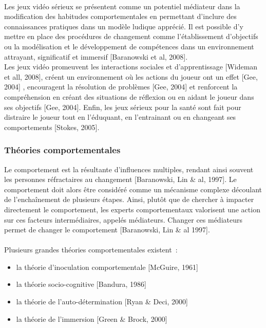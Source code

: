 \paragraph{}
Les jeux vidéo sérieux se présentent comme un potentiel médiateur dans la modification des habitudes comportementales en permettant d’inclure des connaissances pratiques dans un modèle ludique apprécié. Il est possible d’y mettre en place des procédures de changement comme l’établissement d’objectifs ou la modélisation et le développement de compétences dans un environnement attrayant, significatif et immersif [Baranowski et al, 2008]\cite{Bara08}. \\
Les jeux vidéo promeuvent les interactions sociales et d’apprentissage [Wideman et all, 2008], créent un environnement où les actions du joueur ont un effet [Gee, 2004]\cite{Gee04} , encouragent la résolution de problèmes [Gee, 2004]\cite{Gee04} et renforcent la compréhension en créant des situations de réflexion ou en aidant le joueur dans ses objectifs [Gee, 2004]\cite{Gee04}. Enfin, les jeux sérieux pour la santé sont fait pour distraire le joueur tout en l’éduquant, en l’entrainant ou en changeant ses comportements [Stokes, 2005]\cite{Stok05}.

		\subsubsection*{Théories comportementales}
Le comportement est la résultante d’influences multiples, rendant ainsi souvent les personnes réfractaires au changement [Baranowski, Lin \& al, 1997]\cite{Bara97}. Le comportement doit alors être considéré comme un mécanisme complexe découlant de l’enchaînement de plusieurs étapes. Ainsi, plutôt que de chercher à impacter directement le comportement, les experts comportementaux valorisent une action sur ces facteurs intermédiaires, appelés médiateurs. Changer ces médiateurs permet de changer le comportement [Baranowski, Lin \& al 1997]\cite{Bara97}.
\paragraph{}Plusieurs grandes théories comportementales existent~:
\begin{itemize}
	\item la théorie d’inoculation comportementale [McGuire, 1961]
	\item la théorie socio-cognitive [Bandura, 1986]
	\item la théorie de l’auto-détermination [Ryan \& Deci, 2000]
	\item la théorie de l’immersion [Green \& Brock, 2000]
\end{itemize}

